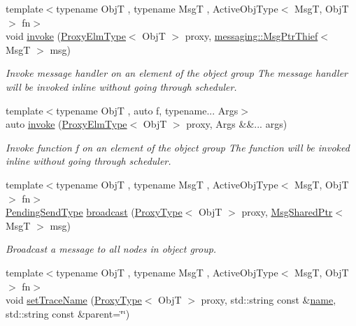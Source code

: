 \begin{DoxyCompactItemize}
{\footnotesize template$<$typename ObjT , typename MsgT , Active\+Obj\+Type$<$ Msg\+T, Obj\+T $>$ fn$>$ }\\void \hyperlink{structvt_1_1objgroup_1_1_obj_group_manager_a5ff347b7aca2c08892d3206c4b028fd3}{invoke} (\hyperlink{structvt_1_1objgroup_1_1_obj_group_manager_adba6c8ecb0f4c30e719f1abb995cfc9b}{Proxy\+Elm\+Type}$<$ ObjT $>$ proxy, \hyperlink{structvt_1_1messaging_1_1_msg_ptr_thief}{messaging\+::\+Msg\+Ptr\+Thief}$<$ MsgT $>$ msg)
\begin{DoxyCompactList}\small\item\em Invoke message handler on an element of the object group The message handler will be invoked inline without going through scheduler. \end{DoxyCompactList}\item 
{\footnotesize template$<$typename ObjT , auto f, typename... Args$>$ }\\auto \hyperlink{structvt_1_1objgroup_1_1_obj_group_manager_a3d1f8358566421b05f755b03b776c801}{invoke} (\hyperlink{structvt_1_1objgroup_1_1_obj_group_manager_adba6c8ecb0f4c30e719f1abb995cfc9b}{Proxy\+Elm\+Type}$<$ ObjT $>$ proxy, Args \&\&... args)
\begin{DoxyCompactList}\small\item\em Invoke function \textquotesingle{}f\textquotesingle{} on an element of the object group The function will be invoked inline without going through scheduler. \end{DoxyCompactList}\item 
{\footnotesize template$<$typename ObjT , typename MsgT , Active\+Obj\+Type$<$ Msg\+T, Obj\+T $>$ fn$>$ }\\\hyperlink{structvt_1_1objgroup_1_1_obj_group_manager_a4f82f640edf670ba5a282074e5710921}{Pending\+Send\+Type} \hyperlink{structvt_1_1objgroup_1_1_obj_group_manager_aada9378cc1fd44caff3c4dcb79aaf582}{broadcast} (\hyperlink{structvt_1_1objgroup_1_1_obj_group_manager_aea65eef52f240a52210132eef5ce591f}{Proxy\+Type}$<$ ObjT $>$ proxy, \hyperlink{namespacevt_ab2b3d506ec8e8d1540aede826d84a239}{Msg\+Shared\+Ptr}$<$ MsgT $>$ msg)
\begin{DoxyCompactList}\small\item\em Broadcast a message to all nodes in object group. \end{DoxyCompactList}\item 
{\footnotesize template$<$typename ObjT , typename MsgT , Active\+Obj\+Type$<$ Msg\+T, Obj\+T $>$ fn$>$ }\\void \hyperlink{structvt_1_1objgroup_1_1_obj_group_manager_a922a82ded79fdefb5fd7de60bde77aad}{set\+Trace\+Name} (\hyperlink{structvt_1_1objgroup_1_1_obj_group_manager_aea65eef52f240a52210132eef5ce591f}{Proxy\+Type}$<$ ObjT $>$ proxy, std\+::string const \&\hyperlink{structvt_1_1objgroup_1_1_obj_group_manager_a92c0b07c2d90063c40087f625880cca3}{name}, std\+::string const \&parent=\char`\"{}\char`\"{})

\end{DoxyCompactItemize}
